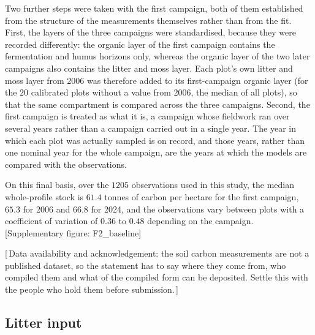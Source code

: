 \documentclass[11pt]{article}
\newcommand{\gap}[1]{\textcolor{red!70!black}{\small[\,#1\,]}}
\newcommand{\suppfig}[1]{\textcolor{blue!55!black}{\small[Supplementary figure: \textsf{#1}]}}
\begin{document}
Two further steps were taken with the first campaign, both of them established from the
structure of the measurements themselves rather than from the fit. First, the layers of the
three campaigns were standardised, because they were recorded differently: the organic layer
of the first campaign contains the fermentation and humus horizons only, whereas the organic
layer of the two later campaigns also contains the litter and moss layer. Each plot's own
litter and moss layer from 2006 was therefore added to its first-campaign organic layer (for
the $20$ calibrated plots without a value from 2006, the median of all plots), so
that the same compartment is compared across the three campaigns. Second, the first campaign
is treated as what it is, a campaign whose fieldwork ran over several years rather than a
campaign carried out in a single year. The year in which each plot was actually sampled is on
record, and those years, rather than one nominal year for the whole campaign, are the years
at which the models are compared with the observations.

On this final basis, over the $1205$ observations used in this study, the median whole-profile
stock is $61.4$ tonnes of carbon per hectare for the first campaign, $65.3$ for 2006 and $66.8$
for 2024, and the observations vary between plots with a coefficient of variation of $0.36$ to
$0.48$ depending on the campaign.
\suppfig{F2\_baseline}

\gap{Data availability and acknowledgement: the soil carbon measurements are not a published
dataset, so the statement has to say where they come from, who compiled them and what of the
compiled form can be deposited. Settle this with the people who hold them before
submission.}

\subsection{Litter input}\label{sec:litter}
\end{document}
